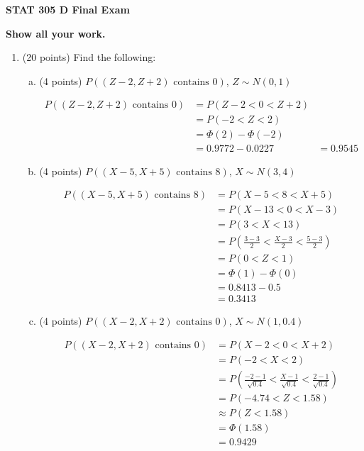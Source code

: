 \documentclass{article}\usepackage{graphicx, color}
\numberwithin{equation}{section}
\begin{document}
\begin{flushleft}


\Huge
\begin{center}
{\bf STAT 305 D Final Exam}
\end{center} 
\huge
\begin{center}
{\bf Show all your work.}
\end{center}

\normalsize
\begin{enumerate}[1. ]

\item (20 points) Find the following:

\begin{enumerate}[a. ]
\item (4 points) $P((Z - 2, Z + 2) \text{ contains } 0)$, $Z \sim N(0,1)$

{\color{red}
\begin{align*}
P((Z - 2, Z + 2) \text{ contains } 0) &= P(Z - 2 < 0 < Z + 2) \\
&= P(-2 < Z < 2) \\
&= \Phi(2) - \Phi(-2) \\
&= 0.9772 - 0.0227
&= 0.9545
\end{align*}}

\item (4 points) $P((X - 5, X + 5) \text{ contains } 8)$, $X \sim N(3,4)$

{\color{red}
\begin{align*}
P((X - 5, X + 5) \text{ contains } 8) & = P(X - 5 < 8 < X + 5) \\
&= P(X - 13 < 0 < X - 3) \\
&= P(3 < X < 13) \\
&= P(\frac{3 - 3}{2} < \frac{X - 3}{2} < \frac{5 - 3}{2}) \\
&= P(0 < Z < 1) \\
&= \Phi(1) - \Phi(0) \\
&= 0.8413 - 0.5 \\
&= 0.3413
\end{align*}
}

\item (4 points) $P((X - 2, X + 2) \text{ contains } 0)$, $X \sim N(1,0.4)$

{\color{red}
\begin{align*}
P((X - 2, X + 2) \text{ contains } 0) &= P(X - 2 < 0 < X + 2) \\
&= P(-2 < X  < 2) \\
&= P(\frac{-2 -1 }{\sqrt{0.4}} < \frac{X - 1}{\sqrt{0.4}} < \frac{2-1}{\sqrt{0.4}}) \\
&= P(-4.74 < Z < 1.58) \\
&\approx P(Z < 1.58) \\
&= \Phi(1.58) \\
&=  0.9429
\end{align*}
}



\end{enumerate}
\end{enumerate}
\end{flushleft}
\end{document}
